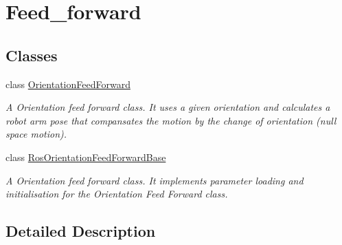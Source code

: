 \hypertarget{group__feed__forward}{}\section{Feed\+\_\+forward}
\label{group__feed__forward}
\subsection*{Classes}
\begin{DoxyCompactItemize}
\item 
class \hyperlink{classOrientationFeedForward}{Orientation\+Feed\+Forward}
\begin{DoxyCompactList}\small\item\em A Orientation feed forward class. It uses a given orientation and calculates a robot arm pose that compansates the motion by the change of orientation (null space motion). \end{DoxyCompactList}\item 
class \hyperlink{classRosOrientationFeedForwardBase}{Ros\+Orientation\+Feed\+Forward\+Base}
\begin{DoxyCompactList}\small\item\em A Orientation feed forward class. It implements parameter loading and initialisation for the Orientation Feed Forward class. \end{DoxyCompactList}\end{DoxyCompactItemize}


\subsection{Detailed Description}
